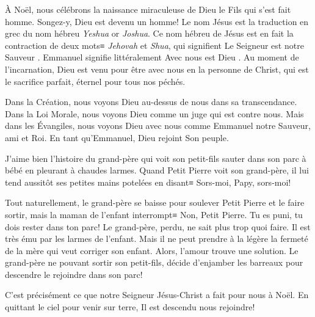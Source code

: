 


À Noël, nous célébrons la naissance miraculeuse de Dieu le Fils qui s'est fait homme. Songez-y, Dieu est devenu un homme! Le nom \og Jésus \fg{} est la traduction en grec du nom hébreu \emph{Yeshua} or \emph{Joshua}. Ce nom hébreu de Jésus est en fait la contraction de deux mots≡ \emph{Jehovah} et \emph{Shua}, qui signifient \og Le Seigneur est notre Sauveur \fg{}. Emmanuel signifie littéralement \og Avec nous est Dieu \fg{}. Au moment de l'incarnation, Dieu est venu pour être avec nous en la personne de Christ, qui est le sacrifice parfait, éternel pour tous nos péchés.

Dans la Création, nous voyons Dieu au-dessus de nous dans sa transcendance. Dans la Loi Morale, nous voyons Dieu comme un juge qui est contre nous. Mais dans les Évangiles, nous voyons Dieu avec nous comme Emmanuel \ocadr notre Sauveur, ami et Roi. En tant qu'Emmanuel, Dieu rejoint Son peuple.

J'aime bien l'histoire du grand-père qui voit son petit-fils sauter dans son parc à bébé en pleurant à chaudes larmes. Quand Petit Pierre voit son grand-père, il lui tend aussitôt ses petites mains potelées en disant≡ \og Sors-moi, Papy, sors-moi! \fg{}

Tout naturellement, le grand-père se baisse pour soulever Petit Pierre et le faire sortir, mais la maman de l'enfant interrompt≡ \og Non, Petit Pierre. Tu es puni, tu dois rester dans ton parc! \fg{} Le grand-père, perdu, ne sait plus trop quoi faire. Il est très ému par les larmes de l'enfant. Mais il ne peut prendre à la légère la fermeté de la mère qui veut corriger son enfant. Alors, l'amour trouve une solution. Le grand-père ne pouvant sortir son petit-fils, décide d'enjamber les barreaux pour descendre le rejoindre dans son parc!

C'est précisément ce que notre Seigneur Jésus-Christ a fait pour nous à Noël. En quittant le ciel pour venir sur terre, Il est descendu nous rejoindre!



